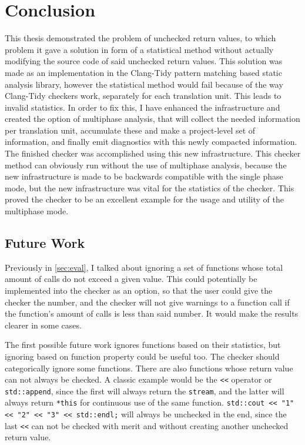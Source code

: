 
\chapter{Conclusion}
\label{ch:sum}

This thesis demonstrated the problem of unchecked return values, to which problem it gave a solution in form of a statistical method without
actually modifying the source code of said unchecked return values. This solution was made as an implementation in the Clang-Tidy pattern
matching based static analysis library, however the statistical method would fail because of the way Clang-Tidy checkers work, separately
for each translation unit. This leads to invalid statistics. In order to fix this, I have enhanced the infrastructure and created the
option of multiphase analysis, that will collect the needed information per translation unit, accumulate these and make a project-level set
of information, and finally emit diagnostics with this newly compacted information. The finished checker was accomplished using this new
infrastructure. This checker method can obviously run without the use of multiphase analysis, because the new infrastructure is made to be
backwards compatible with the single phase mode, but the new infrastructure was vital for the statistics of the checker. This proved the
checker to be an excellent example for the usage and utility of the multiphase mode.

\section{Future Work}

Previously in \cref{sec:eval}, I talked about ignoring a set of functions whose total amount of calls do not exceed a given value. This could
potentially be implemented into the checker as an option, so that the user could give the checker the number, and the checker will not give
warnings to a function call if the function's amount of calls is less than said number. It would make the results clearer in some cases.

The first possible future work ignores functions based on their statistics, but ignoring based on function property could be useful too.
The checker should categorically ignore some functions. There are also functions whose return value can not always be checked. A classic
example would be the \texttt{<<} operator or \texttt{std::append}, since the first will always return the \texttt{stream}, and the latter
will always return \texttt{*this} for continuous use of the same function. \texttt{std::cout << "1" << "2" << "3" << std::endl;} will
always be unchecked in the end, since the last \lstinline{<<} can not be checked with merit and without creating another unchecked return value.

